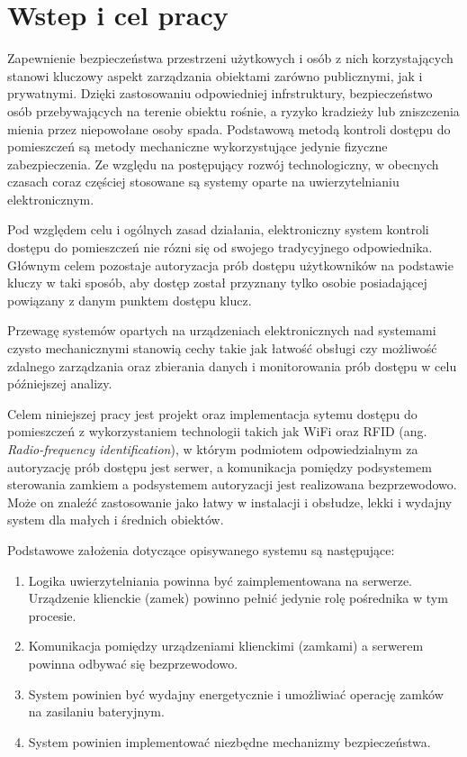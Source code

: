 \chapter{Wstep i cel pracy}

Zapewnienie bezpieczeństwa przestrzeni użytkowych i osób z nich korzystających stanowi kluczowy aspekt zarządzania obiektami zarówno publicznymi, jak i prywatnymi. Dzięki zastosowaniu odpowiedniej infrstruktury, bezpieczeństwo osób przebywających na terenie obiektu rośnie, a ryzyko kradzieży lub zniszczenia mienia przez niepowołane osoby spada. Podstawową metodą kontroli dostępu do pomieszczeń są metody mechaniczne wykorzystujące jedynie fizyczne zabezpieczenia. Ze względu na postępujący rozwój technologiczny, w obecnych czasach coraz częściej stosowane są systemy oparte na uwierzytelnianiu elektronicznym.

Pod względem celu i ogólnych zasad działania, elektroniczny system kontroli dostępu do pomieszczeń nie rózni się od swojego tradycyjnego odpowiednika. Głównym celem pozostaje autoryzacja prób dostępu użytkowników na podstawie kluczy w taki sposób, aby dostęp został przyznany tylko osobie posiadającej powiązany z danym punktem dostępu klucz.

Przewagę systemów opartych na urządzeniach elektronicznych nad systemami czysto mechanicznymi stanowią cechy takie jak łatwość obsługi czy możliwość zdalnego zarządzania oraz zbierania danych i monitorowania prób dostępu w celu późniejszej analizy.

Celem niniejszej pracy jest projekt oraz implementacja sytemu dostępu do pomieszczeń z wykorzystaniem technologii takich jak WiFi oraz RFID (ang. \textit{Radio-frequency identification}), w którym podmiotem odpowiedzialnym za autoryzację prób dostępu jest serwer, a komunikacja pomiędzy podsystemem sterowania zamkiem a podsystemem autoryzacji jest realizowana bezprzewodowo. Może on znaleźć zastosowanie jako łatwy w instalacji i obsłudze, lekki i wydajny system dla małych i średnich obiektów.

Podstawowe założenia dotyczące opisywanego systemu są następujące:

\begin{enumerate}
    \item Logika uwierzytelniania powinna być zaimplementowana na serwerze. Urządzenie klienckie (zamek) powinno pełnić jedynie rolę pośrednika w tym procesie.
    \item Komunikacja pomiędzy urządzeniami klienckimi (zamkami) a serwerem powinna odbywać się bezprzewodowo.
    \item System powinien być wydajny energetycznie i umożliwiać operację zamków na zasilaniu bateryjnym.
    \item System powinien implementować niezbędne mechanizmy bezpieczeństwa.
\end{enumerate}

